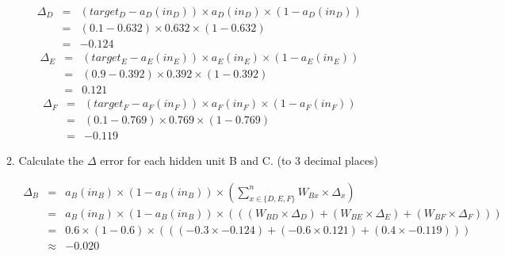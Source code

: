 \documentclass[solution]{ditpaper}
\begin{document}
\begin{enumerate}
\begin{enumerate}
		\begin{answer}
		\begin{eqnarray*}
		\Delta_D& = &(target_D - a_D(in_D)) \times a_D(in_D) \times (1-a_D(in_D))\\
		& = &(0.1-0.632) \times 0.632 \times (1-0.632)\\
		& = &-0.124
		\end{eqnarray*}
		\begin{eqnarray*}
		\Delta_E& = &(target_E - a_E(in_E)) \times a_E(in_E) \times (1-a_E(in_E))\\
		& = &(0.9-0.392) \times 0.392 \times (1-0.392)\\
		& = &0.121
		\end{eqnarray*}
		\begin{eqnarray*}
		\Delta_F& = &(target_F - a_F(in_F)) \times a_F(in_F) \times (1-a_F(in_F))\\
		& = &(0.1-0.769) \times 0.769 \times (1-0.769)\\
		& = &-0.119
		\end{eqnarray*}
		\end{answer}
	\item Calculate the \textbf{$\Delta$} error for each hidden unit B and C. (to 3 decimal places)
		\begin{answer}
\begin{eqnarray*}
\Delta_B &=& a_B(in_B) \times (1-a_B(in_B)) \times \left( \sum_{x \in \{D,E,F\}}^{n}W_{Bx} \times \Delta_x \right)\\
&=& a_B(in_B) \times (1-a_B(in_B)) \times \left(((W_{BD} \times \Delta_D)+(W_{BE} \times \Delta_E)+(W_{BF} \times \Delta_F))\right)\\
&=& 0.6 \times (1-0.6) \times \left(((-0.3 \times -0.124)+(-0.6 \times 0.121)+(0.4 \times -0.119))\right)\\
&\approx& -0.020\\
\end{eqnarray*}


\end{answer}
\end{enumerate}
\end{enumerate}
\end{document}
